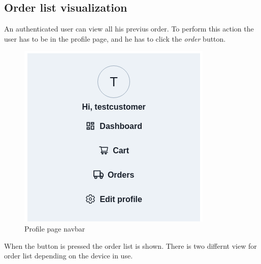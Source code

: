 \subsection{Order list visualization}
An authenticated user can view all his previus order. To perform this action the user has to be in the profile page, and he has to click the \textit{order} button.
\begin{figure}[!ht]
    \caption{Profile page navbar}
    \vspace{10px}
    \includegraphics[scale=0.5]{../../../../Images/userManual/dashboardNavBar.png}
    \centering
\end{figure}
When the button is pressed the order list is shown. There is two differnt view for order list depending on the device in use.
